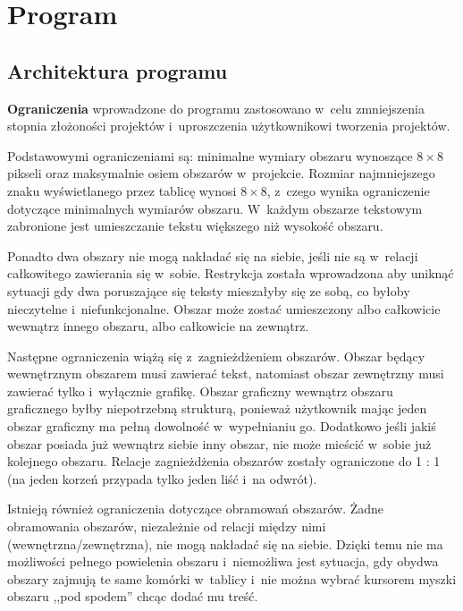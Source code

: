 \section{Program}

\subsection{Architektura programu}


\textbf{Ograniczenia} wprowadzone do programu zastosowano w~celu zmniejszenia stopnia złożoności projektów i~uproszczenia użytkownikowi tworzenia projektów.

Podstawowymi ograniczeniami są: minimalne wymiary obszaru wynoszące $8 \times 8$ pikseli oraz maksymalnie osiem obszarów w~projekcie. Rozmiar najmniejszego znaku wyświetlanego przez tablicę wynosi $8 \times 8$, z~czego wynika ograniczenie dotyczące minimalnych wymiarów obszaru. W~każdym obszarze tekstowym zabronione jest umieszczanie tekstu większego niż wysokość obszaru.

Ponadto dwa obszary nie mogą nakładać się na siebie, jeśli nie są w~relacji całkowitego zawierania się w~sobie. Restrykcja została wprowadzona aby uniknąć sytuacji gdy dwa poruszające się teksty mieszałyby się ze sobą, co byłoby nieczytelne i~niefunkcjonalne. Obszar może zostać umieszczony albo całkowicie wewnątrz innego obszaru, albo całkowicie na zewnątrz.

Następne ograniczenia wiążą się z~zagnieżdżeniem obszarów. Obszar będący wewnętrznym obszarem musi zawierać tekst, natomiast obszar zewnętrzny musi zawierać tylko i~wyłącznie grafikę. Obszar graficzny wewnątrz obszaru graficznego byłby niepotrzebną strukturą, ponieważ użytkownik mając jeden obszar graficzny ma pełną dowolność w~wypełnianiu go. Dodatkowo jeśli jakiś obszar posiada już wewnątrz siebie inny obszar, nie może mieścić w~sobie już kolejnego obszaru. Relacje zagnieżdżenia obszarów zostały ograniczone do 1 : 1 (na jeden korzeń przypada tylko jeden liść i~na odwrót).

Istnieją również ograniczenia dotyczące obramowań obszarów. Żadne obramowania obszarów, niezależnie od relacji między nimi (wewnętrzna/zewnętrzna), nie mogą nakładać się na siebie. Dzięki temu nie ma możliwości pełnego powielenia obszaru i~niemożliwa jest sytuacja, gdy obydwa obszary zajmują te same komórki w~tablicy i~nie można wybrać kursorem myszki obszaru ,,pod spodem'' chcąc dodać mu treść.

